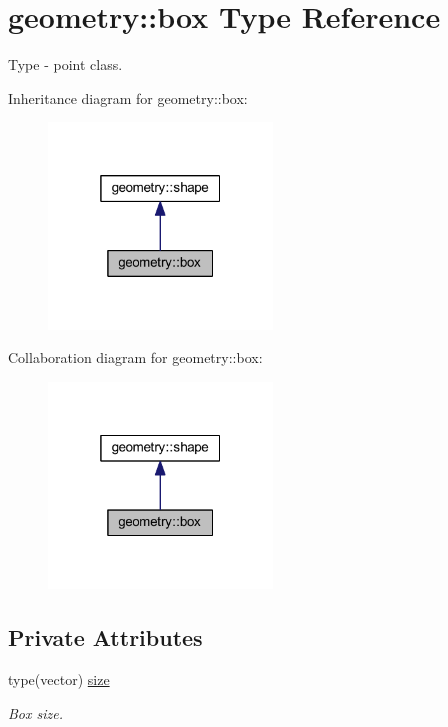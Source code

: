 \hypertarget{structgeometry_1_1box}{}\section{geometry\+:\+:box Type Reference}
\label{structgeometry_1_1box}


Type -\/ point class.  




Inheritance diagram for geometry\+:\+:box\+:\nopagebreak
\begin{figure}[H]
\begin{center}
\leavevmode
\includegraphics[width=169pt]{structgeometry_1_1box__inherit__graph}
\end{center}
\end{figure}


Collaboration diagram for geometry\+:\+:box\+:\nopagebreak
\begin{figure}[H]
\begin{center}
\leavevmode
\includegraphics[width=169pt]{structgeometry_1_1box__coll__graph}
\end{center}
\end{figure}
\subsection*{Private Attributes}
\begin{DoxyCompactItemize}
\item 
type(vector) \hyperlink{structgeometry_1_1box_a77c6ce50ff2a5d421ef59cf929f81f3d}{size}
\begin{DoxyCompactList}\small\item\em Box size. \end{DoxyCompactList}\end{DoxyCompactItemize}


